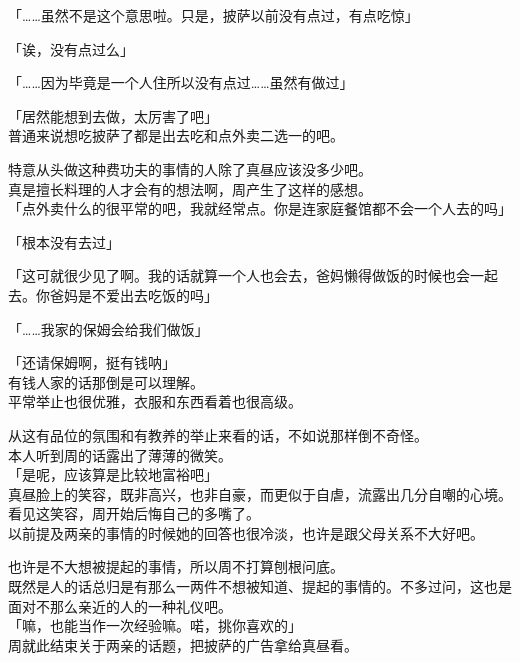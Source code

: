 「……虽然不是这个意思啦。只是，披萨以前没有点过，有点吃惊」

「诶，没有点过么」

「……因为毕竟是一个人住所以没有点过……虽然有做过」

「居然能想到去做，太厉害了吧」\\

普通来说想吃披萨了都是出去吃和点外卖二选一的吧。

特意从头做这种费功夫的事情的人除了真昼应该没多少吧。\\

真是擅长料理的人才会有的想法啊，周产生了这样的感想。\\

「点外卖什么的很平常的吧，我就经常点。你是连家庭餐馆都不会一个人去的吗」

「根本没有去过」

「这可就很少见了啊。我的话就算一个人也会去，爸妈懒得做饭的时候也会一起去。你爸妈是不爱出去吃饭的吗」

「……我家的保姆会给我们做饭」

「还请保姆啊，挺有钱呐」\\

有钱人家的话那倒是可以理解。\\

平常举止也很优雅，衣服和东西看着也很高级。

从这有品位的氛围和有教养的举止来看的话，不如说那样倒不奇怪。\\

本人听到周的话露出了薄薄的微笑。\\

「是呢，应该算是比较地富裕吧」\\

真昼脸上的笑容，既非高兴，也非自豪，而更似于自虐，流露出几分自嘲的心境。看见这笑容，周开始后悔自己的多嘴了。\\

以前提及两亲的事情的时候她的回答也很冷淡，也许是跟父母关系不大好吧。

也许是不大想被提起的事情，所以周不打算刨根问底。\\

既然是人的话总归是有那么一两件不想被知道、提起的事情的。不多过问，这也是面对不那么亲近的人的一种礼仪吧。\\

「嘛，也能当作一次经验嘛。喏，挑你喜欢的」\\

周就此结束关于两亲的话题，把披萨的广告拿给真昼看。\\

